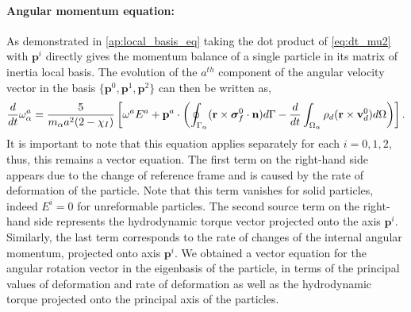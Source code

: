 \paragraph*{Angular momentum equation:}
As demonstrated in \ref{ap:local_basis_eq} taking the dot product of \ref{eq:dt_mu2} with $\textbf{p}^i$ directly gives the momentum balance of a single particle in its matrix of inertia local basis. 
The evolution of the $a^{th}$ component of the angular velocity vector in the basis $\{\textbf{p}^0, \textbf{p}^1, \textbf{p}^2\}$ can then be written as, 
\begin{equation}
    \ddt\omega^a_\alpha
    = 
    \frac{5}{m_\alpha a^2 (2 - \chi_I)}
    \left[
    \omega^a E^a 
    +
    \textbf{p}^a \cdot \left(
        \intS{(\textbf{r}\times\bm\sigma_f^0\cdot \textbf{n})} 
        - \ddt\intO{\rho_d(\textbf{r}\times \textbf{v}_d^0)}
    \right)
    \right].  
    \label{eq:dt_omega_a}  
\end{equation}
It is important to note that this equation applies separately for each $i = 0,1,2$, thus, this remains a vector equation. 
The first term on the right-hand side appears due to the change of reference frame and is caused by the rate of deformation of the particle.
Note that this term vanishes for solid particles, indeed $E^i = 0$ for unreformable particles. 
The second source term on the right-hand side represents the hydrodynamic torque vector projected onto the axis $\textbf{p}^i$. 
Similarly, the last term corresponds to the rate of changes of the internal angular momentum, projected onto axis $\textbf{p}^i$. 
We obtained a vector equation for the angular rotation vector in the eigenbasis of the particle, in terms of the principal values of deformation and rate of deformation as well as the hydrodynamic torque projected onto the principal axis of the particles.  




